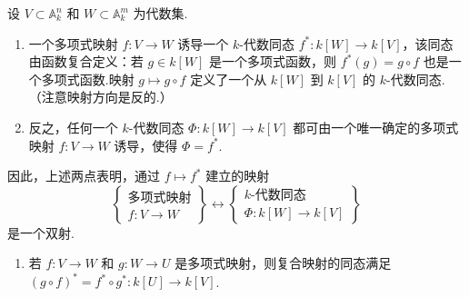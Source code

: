 \begin{theorem}
设 \(V \subset  {\mathbb{A}}_{k}^{n}\) 和 \(W \subset  {\mathbb{A}}_{k}^{m}\) 为代数集.
\begin{enumerate}
    \item[\upshape (1)] 一个多项式映射 \(f : V \rightarrow  W\) 诱导一个 \(k\)-代数同态 \({f}^{ * } : k[W] \rightarrow  k[V]\)，该同态由函数复合定义：若 \(g \in  k[W]\) 是一个多项式函数，则 \({f}^{ * }(g) = g \circ  f\) 也是一个多项式函数.映射 \(g \mapsto  g \circ  f\) 定义了一个从 \(k[W]\) 到 \(k[V]\) 的 \(k\)-代数同态.（注意映射方向是反的.）

    \item[\upshape (2)] 反之，任何一个 \(k\)-代数同态 \(\Phi  : k[W] \rightarrow  k[V]\) 都可由一个唯一确定的多项式映射 \(f : V \rightarrow  W\) 诱导，使得 \(\Phi  = {f}^{ * }\).
\end{enumerate}
因此，上述两点表明，通过 \(f \mapsto  {f}^{ * }\) 建立的映射
\[
\left\{ \begin{array}{c} \text{多项式映射} \\ f : V \rightarrow  W \end{array} \right\} \longleftrightarrow \left\{ \begin{array}{c} k\text{-代数同态} \\ \Phi  : k[W] \rightarrow  k[V] \end{array} \right\}
\]
是一个双射.
\begin{enumerate}
    \item[\upshape (3)] 若 \(f : V \rightarrow  W\) 和 \(g : W \rightarrow  U\) 是多项式映射，则复合映射的同态满足 \({\left( g \circ  f\right) }^{ * } = {f}^{ * } \circ  {g}^{ * } : k[U] \rightarrow  k[V]\).
\end{enumerate}
\end{theorem}

